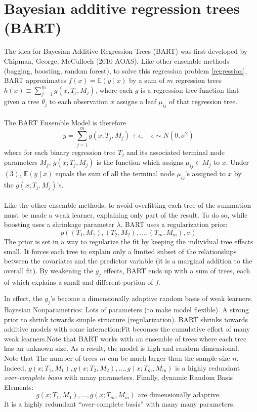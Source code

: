 \documentclass[a4paper,11pt]{article}
\begin{document}
\section{Bayesian additive regression trees (BART)}
The idea for Bayesian Additive Regression Trees (BART) was first developed by Chipman, George, McCulloch (2010 AOAS). Like other ensemble methods (bagging, boosting, random forest), to solve this regression problem \eqref{regression}, BART approximates \( f(x) = \mathbb{E}(y \mid x) \) by a sum of $m$ regression trees \( h(x) \equiv \sum_{j=1}^m g(x, T_j, M_j)\), where each \( g \) is a regression tree function that given a tree $\theta_j$ to each observation $x$  assigns a leaf $\mu_{ij}$ of that regression tree.
\\\\The BART Ensemble Model is therefore
\[
y = \sum_{j=1}^m g(x; T_j, M_j) + \epsilon, \quad \epsilon \sim N(0, \sigma^2) \tag{3}
\]
where for each binary regression tree \( T_j \) and its associated terminal node parameters \( M_j \), \( g(x; T_j, M_j) \) is the function which assigns \( \mu_{ij} \in M_j \) to \( x \). Under \((3)\), \( \mathbb{E}(y \mid x) \) equals the sum of all the terminal node \( \mu_{ij} \)'s assigned to \( x \) by the \( g(x; T_j, M_j) \)'s.
\\\\Like the other ensemble methods, to avoid overfitting each tree of the summation must be made a weak learner, explaining only part of the result. To do so, while boosting uses a shrinkage parameter $\lambda$, BART uses a regularization prior:
\[
p((T_1, M_1), (T_2, M_2), \ldots, (T_m, M_m), \sigma)
\]
The prior is set in a way to regularize the fit by keeping the individual tree effects small. It forces each tree to explain only a limited subset of the relationships between the covariates and the predictor variable (it is a marginal addition to the overall fit). By weakening the \( g_j \) effects, BART ends up with a sum of trees, each of which explains a small and different portion of \( f \).


In effect, the \( g_j \)'s become a dimensionally adaptive random basis of weak learners. Bayesian Nonparametrics: Lots of parameters (to make model flexible).
A strong prior to shrink towards simple structure (regularization). BART shrinks towards additive models with some interaction:Fit becomes the cumulative effort of many weak learners.Note that BART works with an ensemble of trees where each tree has an unknown size. As a result, the model is high and random dimensional.  Note that The number of trees $m$ can be much larger than the sample size $n$. Indeed, $g(x; T_1, M_1), g(x; T_2, M_2), \ldots, g(x; T_m, M_m)$ is a highly redundant \textit{over-complete basis} with many parameters.
Finally, dynamic Random Basis Elements:
\[
g(x; T_1, M_1), \ldots, g(x; T_m, M_m) \text{ are dimensionally adaptive.}
\]
It is a highly redundant “over-complete basis” with many many parameters.
\end{document}
